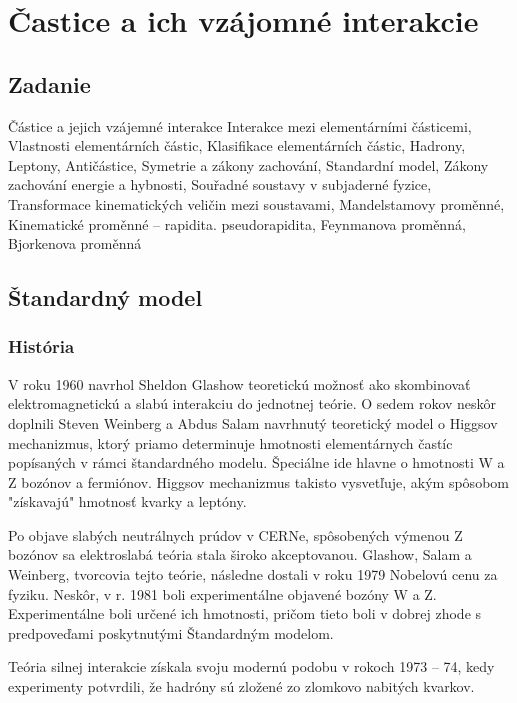 \documentclass[../../main.tex]{subfiles}
\begin{document}
\chapter{Častice a ich vzájomné interakcie}
\section{Zadanie}
Částice a jejich vzájemné interakce
Interakce mezi elementárními částicemi, Vlastnosti elementárních částic, Klasifikace elementárních částic, Hadrony, Leptony, Antičástice, Symetrie a zákony zachování, Standardní model, Zákony zachování energie a hybnosti, Souřadné soustavy v subjaderné fyzice, Transformace kinematických veličin mezi soustavami, Mandelstamovy proměnné, Kinematické proměnné – rapidita. pseudorapidita, Feynmanova proměnná, Bjorkenova proměnná

\section{Štandardný model}
\subsection{História}
V roku 1960 navrhol Sheldon Glashow teoretickú možnosť ako skombinovať elektromagnetickú a slabú interakciu do jednotnej teórie. O sedem rokov neskôr doplnili Steven Weinberg a Abdus Salam navrhnutý teoretický model o Higgsov mechanizmus, ktorý priamo determinuje hmotnosti elementárnych častíc popísaných v rámci štandardného modelu. Špeciálne ide hlavne o hmotnosti W a Z bozónov a fermiónov. Higgsov mechanizmus takisto vysvetľuje, akým spôsobom "získavajú" hmotnosť kvarky a leptóny.\par
Po objave slabých neutrálnych prúdov v CERNe, spôsobených výmenou Z bozónov sa elektroslabá teória stala široko akceptovanou. Glashow, Salam a Weinberg, tvorcovia tejto teórie, následne dostali v roku 1979 Nobelovú cenu za fyziku. Neskôr, v r. 1981 boli experimentálne objavené bozóny W a Z. Experimentálne boli určené ich hmotnosti, pričom tieto boli v dobrej zhode s predpoveďami poskytnutými Štandardným modelom.\par
Teória silnej interakcie získala svoju modernú podobu v rokoch 1973 – 74, kedy experimenty potvrdili, že hadróny sú zložené zo zlomkovo nabitých kvarkov.
\end{document}
